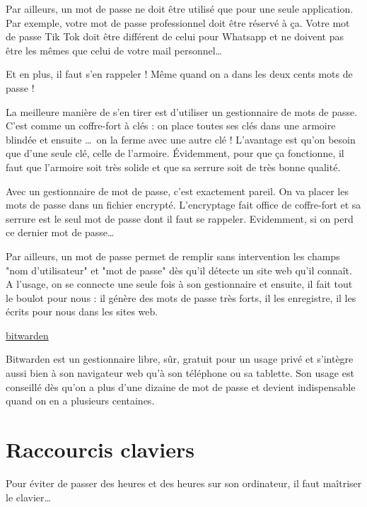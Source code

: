 \documentclass[10pt,a4paper]{report}
\begin{document}
Par ailleurs, un mot de passe ne doit être utilisé que pour une seule application. Par exemple, votre mot de passe professionnel doit être réservé à ça. Votre mot de passe Tik Tok doit être différent de celui pour Whatsapp et ne doivent pas être les mêmes que celui de votre mail personnel\dots

Et en plus, il faut s'en rappeler ! Même quand on a dans les deux cents mots de passe !

La meilleure manière de s'en tirer est d'utiliser un gestionnaire de mots de passe. C'est comme un coffre-fort à clés : on place toutes ses clés dans une armoire blindée et ensuite \dots \ on la ferme avec une autre clé ! L'avantage est qu'on besoin que d'une seule clé, celle de l'armoire. Évidemment, pour que ça fonctionne, il faut que l'armoire soit très solide et que sa serrure soit de très bonne qualité.

Avec un gestionnaire de mot de passe, c'est exactement pareil. On va placer les mots de passe dans un fichier encrypté. L'encryptage fait office de coffre-fort et sa serrure est le seul mot de passe dont il faut se rappeler. Evidemment, si on perd ce dernier mot de passe\dots

Par ailleurs, un mot de passe permet de remplir sans intervention les champs "nom d'utilisateur" et "mot de passe" dès qu'il détecte un site web qu'il connaît. A l'usage, on se connecte une seule fois à son gestionnaire et ensuite, il fait tout le boulot pour nous : il génère des mots de passe très forts, il les enregistre, il les écrits pour nous dans les sites web.

\href{https://bitwarden.com/}{bitwarden}

Bitwarden est un gestionnaire libre, sûr, gratuit pour un usage privé et s'intègre aussi bien à son navigateur web qu'à son téléphone ou sa tablette. Son usage est conseillé dès qu'on a plus d'une dizaine de mot de passe et devient indispensable quand on en a plusieurs centaines.





\section{Raccourcis claviers}

Pour éviter de passer des heures et des heures sur son ordinateur, il faut maîtriser le clavier\dots

\end{document}
